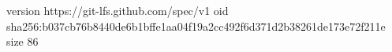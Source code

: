 version https://git-lfs.github.com/spec/v1
oid sha256:b037cb76b8440de6b1bffe1aa04f19a2cc492f6d371d2b38261de173e72f211e
size 86

